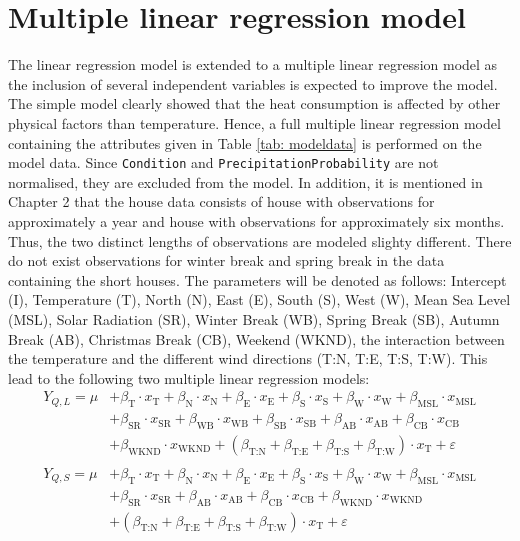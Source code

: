 \section{Multiple linear regression model}
The linear regression model is extended to a multiple linear regression model as the inclusion of several independent variables is expected to improve the model. The simple model clearly showed that the heat consumption is affected by other physical factors than temperature. Hence, a full multiple linear regression model containing the attributes given in Table \ref{tab: modeldata} is performed on the model data. Since \texttt{Condition} and \texttt{PrecipitationProbability} are not normalised, they are excluded from the model. In addition, it is mentioned in Chapter 2 that the house data consists of house with observations for approximately a year and house with observations for approximately six months. Thus, the two distinct lengths of observations are modeled slighty different. There do not exist observations for winter break and spring break in the data containing the short houses. The parameters will be denoted as follows: Intercept (I), Temperature (T), North (N), East (E), South (S), West (W), Mean Sea Level (MSL), Solar Radiation (SR), Winter Break (WB), Spring Break (SB), Autumn Break (AB), Christmas Break (CB), Weekend (WKND), the interaction between the temperature and the different wind directions (T:N, T:E, T:S, T:W). This lead to the following two multiple linear regression models:
\begin{align}
    Y_{Q,L} = \mu & + \beta_{\text{T}}\cdot x_{\text{T}} + \beta_{\text{N}}\cdot x_{\text{N}} + \beta_{\text{E}}\cdot x_{\text{E}}+ \beta_{\text{S}}\cdot x_{\text{S}} + \beta_{\text{W}}\cdot x_{\text{W}} + \beta_{\text{MSL}}\cdot x_{\text{MSL}} \nonumber \\ & + \beta_{\text{SR}}\cdot x_{\text{SR}} + \beta_{\text{WB}}\cdot x_{\text{WB}} + \beta_{\text{SB}}\cdot x_{\text{SB}}  + \beta_{\text{AB}}\cdot x_{\text{AB}} + \beta_{\text{CB}}\cdot x_{\text{CB}} \label{eq: multi_L}  \\ & + \beta_{\text{WKND}}\cdot x_{\text{WKND}} + (\beta_{\text{T:N}} + \beta_{\text{T:E}} + \beta_{\text{T:S}} + \beta_{\text{T:W}}) \cdot x_{\text{T}} + \varepsilon \nonumber \\ \nonumber \\
    Y_{Q,S} = \mu & + \beta_{\text{T}}\cdot x_{\text{T}} + \beta_{\text{N}}\cdot x_{\text{N}} + \beta_{\text{E}}\cdot x_{\text{E}}+ \beta_{\text{S}}\cdot x_{\text{S}} + \beta_{\text{W}}\cdot x_{\text{W}} + \beta_{\text{MSL}}\cdot x_{\text{MSL}} \nonumber \\ & + \beta_{\text{SR}}\cdot x_{\text{SR}} + \beta_{\text{AB}}\cdot x_{\text{AB}} + \beta_{\text{CB}}\cdot x_{\text{CB}} + \beta_{\text{WKND}}\cdot x_{\text{WKND}} \label{eq: multi_S} \\ & + (\beta_{\text{T:N}} + \beta_{\text{T:E}} + \beta_{\text{T:S}} + \beta_{\text{T:W}}) \cdot x_{\text{T}} + \varepsilon  \nonumber
\end{align}
